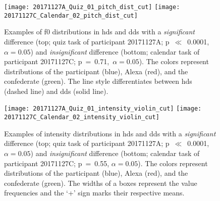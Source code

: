 \begin{figure}
	\centering
	\texttt{[image: 20171127A\_Quiz\_01\_pitch\_dist\_cut]}
	\texttt{[image: 20171127C\_Calendar\_02\_pitch\_dist\_cut]}
	\vspace{0.3cm}
	\caption[Interactions with significant and insignificant \acs{f0} distributions difference between \acs{hds} and \acs{dds}]
		{Examples of \ac{f0} distributions in \ac{hds} and \ac{dds} with a \emph{significant} difference (top; quiz task of participant 20171127A; p~$\ll$~0.0001,~$\alpha=0.05$) and \emph{insignificant} difference (bottom; calendar task of participant 20171127C; p~=~0.71,~$\alpha=0.05$).
		The colors represent distributions of the participant (blue), Alexa (red), and the confederate (green).
		The line style differentiates between \ac{hds} (dashed line) and \ac{dds} (solid line).}
	\label{fig:hds_dds_dist}
\end{figure}
%
\begin{figure}
	\texttt{[image: 20171127A\_Quiz\_01\_intensity\_violin\_cut]}
	\texttt{[image: 20171127C\_Calendar\_02\_intensity\_violin\_cut]}
	\caption[Interactions with significant and insignificant intensity distributions difference between \acs{hds} and \acs{dds}]
		{Examples of intensity distributions in \ac{hds} and \ac{dds} with a \emph{significant} difference (top; quiz task of participant 20171127A; p~$\ll$~0.0001, $\alpha=0.05$) and \emph{insignificant} difference (bottom; calendar task of participant 20171127C; p~=~0.55, $\alpha=0.05$).
		The colors represent distributions of the participant (blue), Alexa (red), and the confederate (green).
		The widths of a boxes represent the value frequencies and the \enquote*{+} sign marks their respective means.}
	\label{fig:hds_dds_violin}
\end{figure}

